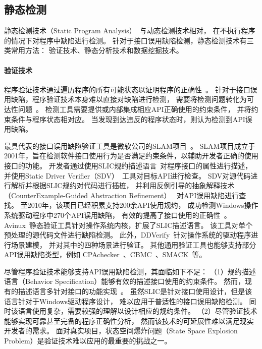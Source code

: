 \subsection{静态检测}
静态检测技术（Static Program Analysis）~\cite{08-ieee-static}与动态检测技术相对，
在不执行程序的情况下对程序中缺陷进行检测。
针对于接口误用缺陷检测，静态检测技术有三类常用方法：
验证技术、静态分析技术和数据挖掘技术。

\paragraph{验证技术}
程序验证技术通过遍历程序的所有可能状态以证明程序的正确性~\cite{08-tcad-sv}。
针对于接口误用缺陷，程序验证技术本身难以直接对缺陷进行检测，
需要将检测问题转化为可达性问题~\cite{rp}。
检测工具需要提供或内部集成相应API正确使用的约束条件，
并将约束条件与程序状态相对应。
当发现到达违反的程序状态时，则认为检测到API误用缺陷。

最具代表的接口误用缺陷验证工具是微软公司的SLAM项目~\cite{slam}。
SLAM项目成立于2001年，旨在检测软件接口使用行为是否满足约束条件，以辅助开发者正确的使用接口的功能。
开发者通过使用SLIC规约描述语言~\cite{01-slic}对程序接口的属性进行描述，
并使用Static Driver Verifier（SDV）~\cite{02-acm-slam}工具对目标API进行检查。
SDV对源代码进行解析并根据SLIC规约对代码进行插桩，
并利用反例引导的抽象解释技术（CounterExample-Guided Abstraction Refinement）
~\cite{00-cav-counter,02-acm-abs}对API误用缺陷进行查找。
至2010年，该项目已经积累支持200余API使用规约，
成功检测Windows操作系统驱动程序中270个API误用缺陷，
有效的提高了接口使用的正确性~\cite{10-cad-slam, 11-acm-slam}。
Avinux~\cite{09-avinux}静态验证工具针对操作系统内核，扩展了SLIC描述语言。
该工具对单个预处理的源代码文件进行缺陷检测。
此外，DDVerify~\cite{07-ase-ddverify}针对操作系统的驱动程序进行场景建模，
并对其中的四种场景进行验证。
其他通用验证工具也能够支持部分API误用缺陷类型，例如
CPAchecker~\cite{07-cav-cpachecker}、CBMC~\cite{14-tacas-cbmc}、SMACK~\cite{14-cav-smack}等。


尽管程序验证技术能够支持API误用缺陷检测，其面临如下不足：
（1）规约描述语言（Behavior Specification）能够有效的描述接口使用的约束条件。
然而，现有的描述语言多针对接口的功能实现~\cite{blast, acsl}。
虽然SLIC是针对接口使用设计，但是该语言针对于Windows驱动程序设计，
难以应用于普适性的接口误用缺陷检测。
同时该语言使用复杂，需要较强的理解以设计相应的规约条件。
（2）尽管验证技术能够实现可靠甚至完备的程序正确性分析，
然而该技术的可延展性难以满足现实开发者的需求。
面对真实项目，状态空间爆炸问题（State Space Explosion Problem）是验证技术难以应用的最重要的挑战之一。

